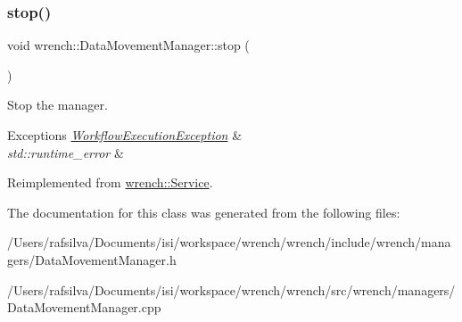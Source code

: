 \subsubsection{\texorpdfstring{stop()}{stop()}}
{\footnotesize\ttfamily void wrench\+::\+Data\+Movement\+Manager\+::stop (\begin{DoxyParamCaption}{ }\end{DoxyParamCaption})\hspace{0.3cm}{\ttfamily [virtual]}}



Stop the manager. 


\begin{DoxyExceptions}{Exceptions}
{\em \hyperlink{classwrench_1_1_workflow_execution_exception}{Workflow\+Execution\+Exception}} & \\
\hline
{\em std\+::runtime\+\_\+error} & \\
\hline
\end{DoxyExceptions}


Reimplemented from \hyperlink{classwrench_1_1_service_ac33a32f4758c6f51b27d2cfb9b46efda}{wrench\+::\+Service}.



The documentation for this class was generated from the following files\+:\begin{DoxyCompactItemize}
\item 
/\+Users/rafsilva/\+Documents/isi/workspace/wrench/wrench/include/wrench/managers/Data\+Movement\+Manager.\+h\item 
/\+Users/rafsilva/\+Documents/isi/workspace/wrench/wrench/src/wrench/managers/Data\+Movement\+Manager.\+cpp\end{DoxyCompactItemize}
